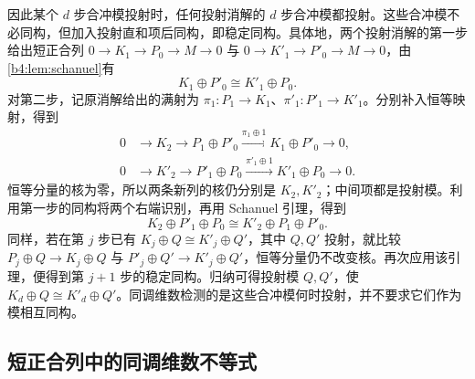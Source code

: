 因此某个 \(d\) 步合冲模投射时，任何投射消解的 \(d\) 步合冲模都投射。这些合冲模不必同构，但加入投射直和项后同构，即稳定同构。具体地，两个投射消解的第一步给出短正合列 \(0\to K_1\to P_0\to M\to0\) 与 \(0\to K'_1\to P'_0\to M\to0\)，由\cref{b4:lem:schanuel}有
\[
	K_1\oplus P'_0\cong K'_1\oplus P_0.
\]
对第二步，记原消解给出的满射为 \(\pi_1:P_1\to K_1\)、\(\pi'_1:P'_1\to K'_1\)。分别补入恒等映射，得到
\[
	\begin{aligned}
		0&\longrightarrow K_2\longrightarrow P_1\oplus P'_0 \xrightarrow{\pi_1\oplus1}K_1\oplus P'_0\longrightarrow0,\\
		0&\longrightarrow K'_2\longrightarrow P'_1\oplus P_0 \xrightarrow{\pi'_1\oplus1}K'_1\oplus P_0\longrightarrow0.
	\end{aligned}
\]
恒等分量的核为零，所以两条新列的核仍分别是 \(K_2,K'_2\)；中间项都是投射模。利用第一步的同构将两个右端识别，再用 Schanuel 引理，得到
\[
	K_2\oplus P'_1\oplus P_0\cong K'_2\oplus P_1\oplus P'_0.
\]
同样，若在第 \(j\) 步已有 \(K_j\oplus Q\cong K'_j\oplus Q'\)，其中 \(Q,Q'\) 投射，就比较 \(P_j\oplus Q\to K_j\oplus Q\) 与 \(P'_j\oplus Q'\to K'_j\oplus Q'\)，恒等分量仍不改变核。再次应用该引理，便得到第 \(j+1\) 步的稳定同构。归纳可得投射模 \(Q,Q'\)，使 \(K_d\oplus Q\cong K'_d\oplus Q'\)。同调维数检测的是这些合冲模何时投射，并不要求它们作为模相互同构。

\subsection{短正合列中的同调维数不等式}
\label{b4:subsec:1002:02}

